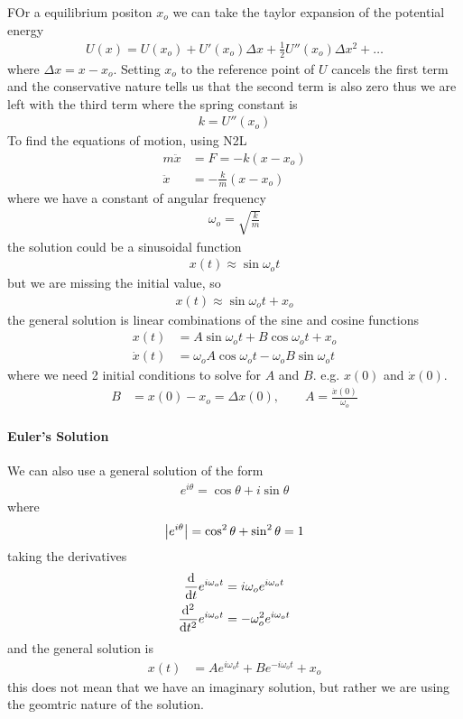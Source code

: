 \documentclass[../main.tex]{subfiles}
\begin{document}
FOr a equilibrium positon $x_o$ we can take the taylor expansion of the potential energy
\begin{align*}
    U(x) = U(x_o) + U' (x_o) \Delta x + \frac{1}{2} U''(x_o) \Delta x^2 + \dots
\end{align*}
where $\Delta x = x - x_o$. Setting $x_o$ to the reference point of $U$ cancels the first term and
the conservative nature tells us that the second term is also zero thus we are left with the third
term where the spring constant is
\begin{align*}
    k = U'' (x_o)
\end{align*}
To find the equations of motion, using N2L
\begin{align*}
    m\ddot x &= F = - k (x - x_o) \\
    \ddot x &= - \frac{k}{m} (x - x_o)
\end{align*}
where we have a constant of angular frequency
\begin{align*}
    \omega_o = \sqrt{\frac{k}{m}}
\end{align*}
the solution could be a sinusoidal function
\begin{align*}
    x(t) \approx \sin \omega_o t 
\end{align*}
but we are missing the initial value, so
\begin{align*}
    x(t) \approx \sin \omega_o t + x_o
\end{align*}
the general solution is linear combinations of the sine and cosine functions
\begin{align*}
    x(t) &= A \sin \omega_o t + B \cos \omega_o t + x_o \\
    \dot x(t) &= \omega_o A \cos \omega_o t - \omega_o B \sin \omega_o t
\end{align*}
where we need 2 initial conditions to solve for $A$ and $B$. e.g. $x(0)$ and $\dot x(0)$.
\begin{align*}
    B &= x(0) - x_o = \Delta x(0), \qquad A = \frac{\dot x(0)}{\omega_o}
\end{align*}

\paragraph*{Euler's Solution} We can also use a general solution of the form
\begin{align*}
    e^{i \theta} = \cos \theta + i \sin \theta
\end{align*}
where
\begin{align*}
    \abs {e^{i \theta}} = \cos^2 \theta + \sin^2 \theta = 1
\end{align*}
taking the derivatives
\begin{align*}
    \dv{t} e^{i \omega_o t} &= i \omega_o e^{i \omega_o t} \\
    \dv[2]{t} e^{i \omega_o t} &= - \omega_o^2 e^{i \omega_o t}
\end{align*}
and the general solution is
\begin{align*}
    x(t) &= A e^{i \omega_o t} + B e^{-i \omega_o t} + x_o
\end{align*}
this does not mean that we have an imaginary solution, but rather we are using the geomtric 
nature of the solution. 
\end{document}
